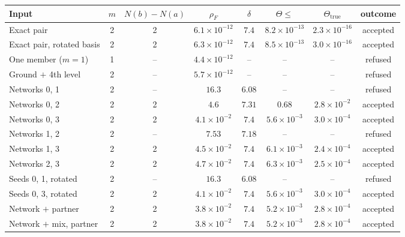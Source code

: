\scriptsize
\setlength{\tabcolsep}{2pt}
\begin{tabular}{lccccccc}
\toprule
Input & $m$ & $N(b)\!-\!N(a)$ & $\rho_F$ & $\delta$ & $\Theta\le$ & $\Theta_{\mathrm{true}}$ & outcome \\
\midrule
Exact pair & 2 & 2 & $6.1\times10^{-12}$ & $7.4$ & $8.2\times10^{-13}$ & $2.3\times10^{-16}$ & accepted \\
Exact pair, rotated basis & 2 & 2 & $6.3\times10^{-12}$ & $7.4$ & $8.5\times10^{-13}$ & $3.0\times10^{-16}$ & accepted \\
One member ($m=1$) & 1 & -- & $4.4\times10^{-12}$ & -- & -- & -- & refused \\
Ground $+$ 4th level & 2 & -- & $5.7\times10^{-12}$ & -- & -- & -- & refused \\
\midrule
Networks 0, 1 & 2 & -- & $16.3$ & $6.08$ & -- & -- & refused \\
Networks 0, 2 & 2 & 2 & $4.6$ & $7.31$ & $0.68$ & $2.8\times10^{-2}$ & accepted \\
Networks 0, 3 & 2 & 2 & $4.1\times10^{-2}$ & $7.4$ & $5.6\times10^{-3}$ & $3.0\times10^{-4}$ & accepted \\
Networks 1, 2 & 2 & -- & $7.53$ & $7.18$ & -- & -- & refused \\
Networks 1, 3 & 2 & 2 & $4.5\times10^{-2}$ & $7.4$ & $6.1\times10^{-3}$ & $2.4\times10^{-4}$ & accepted \\
Networks 2, 3 & 2 & 2 & $4.7\times10^{-2}$ & $7.4$ & $6.3\times10^{-3}$ & $2.5\times10^{-4}$ & accepted \\
Seeds 0, 1, rotated & 2 & -- & $16.3$ & $6.08$ & -- & -- & refused \\
Seeds 0, 3, rotated & 2 & 2 & $4.1\times10^{-2}$ & $7.4$ & $5.6\times10^{-3}$ & $3.0\times10^{-4}$ & accepted \\
Network $+$ partner & 2 & 2 & $3.8\times10^{-2}$ & $7.4$ & $5.2\times10^{-3}$ & $2.8\times10^{-4}$ & accepted \\
Network $+$ mix, partner & 2 & 2 & $3.8\times10^{-2}$ & $7.4$ & $5.2\times10^{-3}$ & $2.8\times10^{-4}$ & accepted \\
\bottomrule
\end{tabular}
